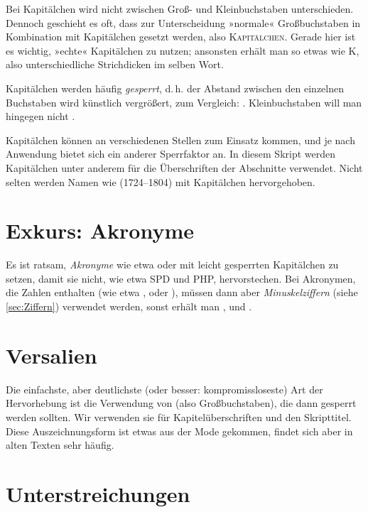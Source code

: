 Bei Kapitälchen wird nicht zwischen Groß- und Kleinbuchstaben
unterschieden. Dennoch geschieht es oft, dass zur Unterscheidung »normale«
Großbuchstaben in Kombination mit Kapitälchen gesetzt werden, also
\textsc{Kapitälchen}. Gerade hier ist es wichtig, »echte« Kapitälchen zu
nutzen; ansonsten erhält man so etwas wie K, also
unterschiedliche Strichdicken im selben Wort.

Kapitälchen werden häufig
\emph{gesperrt}, d.\,h. der Abstand zwischen den einzelnen Buchstaben wird
künstlich vergrößert, zum Vergleich:
. Kleinbuchstaben will man hingegen nicht
.

Kapitälchen können an verschiedenen Stellen zum Einsatz kommen, und je nach
Anwendung bietet sich ein anderer Sperrfaktor an. In diesem Skript werden
Kapitälchen unter anderem für die Überschriften der Abschnitte verwendet. Nicht
selten werden Namen wie  (1724–1804) mit
Kapitälchen hervorgehoben.

\section{Exkurs: Akronyme}

Es ist ratsam, \emph{Akronyme} wie etwa  oder  mit leicht
gesperrten Kapitälchen zu setzen, damit sie nicht, wie etwa SPD und PHP,
hervorstechen. Bei Akronymen, die Zahlen enthalten (wie etwa ,
 oder ), müssen dann aber
\emph{Minuskelziffern} (siehe \cref{sec:Ziffern}) verwendet werden, sonst erhält
man ,  und
.

\section{Versalien}

Die einfachste, aber deutlichste (oder besser: kompromissloseste) Art
der Hervorhebung ist die Verwendung von  (also
Großbuchstaben), die dann gesperrt werden sollten. Wir verwenden sie für
Kapitelüberschriften und den Skripttitel.  Diese Auszeichnungsform ist etwas aus
der Mode gekommen, findet sich aber in alten Texten sehr häufig.

\section{Unterstreichungen}

